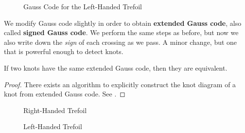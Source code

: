         \begin{figure}
            \centering
            \caption{Gauss Code for the Left-Handed Trefoil}
            \label{fig:left_handed_trefoil_gauss_code}
        \end{figure}
        \par\hfill\par
        We modify Gauss code slightly in order to obtain
        \textbf{extended Gauss code}, also called \textbf{signed Gauss code}.
        We perform the same steps as before, but now we also write down the
        \textit{sign} of each crossing as we pass. A minor change, but one
        that is powerful enough to detect knots.
        \begin{theorem}
            If two knots have the same extended Gauss code, then they are
            equivalent.
        \end{theorem}
        \begin{proof}
            There exists an algorithm to explicitly construct the knot diagram
            of a knot from extended Gauss code. See
            \cite{KauffmanVirtualKnots1999}.
        \end{proof}
        \begin{figure}
            \centering
            \begin{minipage}[b]{0.49\textwidth}
                \centering
                \caption[Right-Handed Trefoil Extended Gauss Code]
                {Right-Handed Trefoil}
                \label{fig:trefoil_knot_oriented_with_extended_gauss_code}
            \end{minipage}
            \hfill
            \begin{minipage}[b]{0.49\textwidth}
                \centering
            \caption[Left-Handed Trefoil Extended Gauss Code]
            {Left-Handed Trefoil}
            \label{fig:trefoil_knot_mirror_oriented_with_extended_gauss_code}
            \end{minipage}
        \end{figure}

